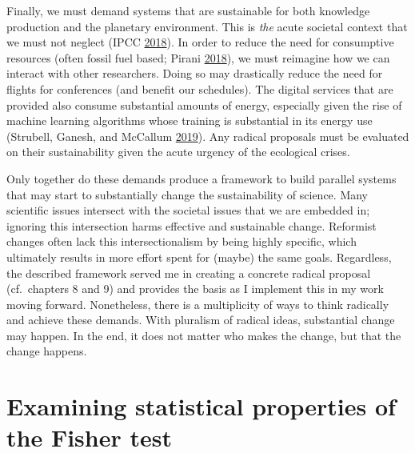 \documentclass[a5paper]{book}
\begin{document}
Finally, we must demand systems that are sustainable for both knowledge
production and the planetary environment. This is \emph{the} acute
societal context that we must not neglect (IPCC
\protect\hyperlink{ref-ipccGlobalWarmingIPCC2018}{2018}). In order to
reduce the need for consumptive resources (often fossil fuel based;
Pirani \protect\hyperlink{ref-isbn:9780745335612}{2018}), we must
reimagine how we can interact with other researchers. Doing so may
drastically reduce the need for flights for conferences (and benefit our
schedules). The digital services that are provided also consume
substantial amounts of energy, especially given the rise of machine
learning algorithms whose training is substantial in its energy use
(Strubell, Ganesh, and McCallum
\protect\hyperlink{ref-DBLP:journalsux2fcorrux2fabs-1906-02243}{2019}).
Any radical proposals must be evaluated on their sustainability given
the acute urgency of the ecological crises.

Only together do these demands produce a framework to build parallel
systems that may start to substantially change the sustainability of
science. Many scientific issues intersect with the societal issues that
we are embedded in; ignoring this intersection harms effective and
sustainable change. Reformist changes often lack this intersectionalism
by being highly specific, which ultimately results in more effort spent
for (maybe) the same goals. Regardless, the described framework served
me in creating a concrete radical proposal (cf.~chapters 8 and 9) and
provides the basis as I implement this in my work moving forward.
Nonetheless, there is a multiplicity of ways to think radically and
achieve these demands. With pluralism of radical ideas, substantial
change may happen. In the end, it does not matter who makes the change,
but that the change happens.

\appendix


\chapter{Examining statistical properties of the Fisher
test}\label{examining-statistical-properties-of-the-fisher-test}
\end{document}
